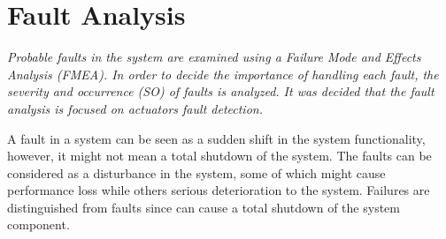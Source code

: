 \chapter{Fault  Analysis }
\textit{Probable faults in the system are examined using a  Failure Mode and Effects Analysis (FMEA). In order to decide the importance of handling each fault, the severity and occurrence (SO)  of faults is analyzed. It was decided that the fault analysis is focused on actuators fault detection.}

\label{chap:fault}



A fault in a system can be seen as a sudden shift in the system functionality, however, it might not mean a total shutdown of the system. The faults can be considered as a disturbance in the system, some of which might cause performance loss while others serious deterioration to the system. Failures are distinguished from faults since can cause a total shutdown of the system component. 

